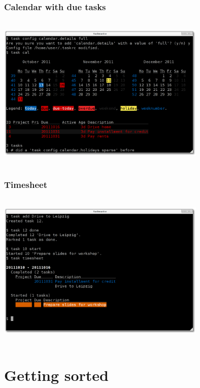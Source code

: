 \documentclass[t,handout]{beamer}
\begin{document}
\begin{frame}
\frametitle{Calendar with due tasks}
\begin{center}
\includegraphics[width=10cm,height=7.5cm]{calendar_with_due_tasks.png}
\end{center}
\end{frame}

\begin{frame}
\frametitle{Timesheet}
\begin{center}
\includegraphics[width=10cm,height=7.5cm]{timesheet.png}
\end{center}
\end{frame}

\section{Getting sorted}
\end{document}

